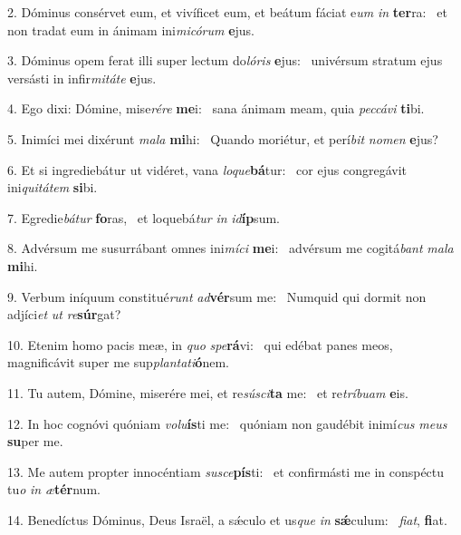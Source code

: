 2. Dóminus consérvet eum, et vivíficet eum, et beátum fáciat e\textit{um} \textit{in} \textbf{ter}ra: \ast\  et non tradat eum in ánimam ini\textit{mi}\textit{có}\textit{rum} \textbf{e}jus.\

3. Dóminus opem ferat illi super lectum do\textit{ló}\textit{ris} \textbf{e}jus: \ast\  univérsum stratum ejus versásti in infir\textit{mi}\textit{tá}\textit{te} \textbf{e}jus.\

4. Ego dixi: Dómine, mise\textit{ré}\textit{re} \textbf{me}i: \ast\  sana ánimam meam, quia \textit{pec}\textit{cá}\textit{vi} \textbf{ti}bi.\

5. Inimíci mei dixérunt \textit{ma}\textit{la} \textbf{mi}hi: \ast\  Quando moriétur, et perí\textit{bit} \textit{no}\textit{men} \textbf{e}jus?\

6. Et si ingrediebátur ut vidéret, vana \textit{lo}\textit{que}\textbf{bá}tur: \ast\  cor ejus congregávit ini\textit{qui}\textit{tá}\textit{tem} \textbf{si}bi.\

7. Egredie\textit{bá}\textit{tur} \textbf{fo}ras, \ast\  et loquebá\textit{tur} \textit{in} \textit{id}\textbf{íp}sum.\

8. Advérsum me susurrábant omnes ini\textit{mí}\textit{ci} \textbf{me}i: \ast\  advérsum me cogitá\textit{bant} \textit{ma}\textit{la} \textbf{mi}hi.\

9. Verbum iníquum constitué\textit{runt} \textit{ad}\textbf{vér}sum me: \ast\  Numquid qui dormit non adjíci\textit{et} \textit{ut} \textit{re}\textbf{súr}gat?\

10. Etenim homo pacis meæ, in \textit{quo} \textit{spe}\textbf{rá}vi: \ast\  qui edébat panes meos, magnificávit super me sup\textit{plan}\textit{ta}\textit{ti}\textbf{ó}nem.\

11. Tu autem, Dómine, miserére mei, et re\textit{sú}\textit{sci}\textbf{ta} me: \ast\  et re\textit{trí}\textit{bu}\textit{am} \textbf{e}is.\

12. In hoc cognóvi quóniam \textit{vo}\textit{lu}\textbf{ís}ti me: \ast\  quóniam non gaudébit inimí\textit{cus} \textit{me}\textit{us} \textbf{su}per me.\

13. Me autem propter innocéntiam \textit{su}\textit{sce}\textbf{pís}ti: \ast\  et confirmásti me in conspéctu tu\textit{o} \textit{in} \textit{æ}\textbf{tér}num.\

14. Benedíctus Dóminus, Deus Israël, a sǽculo et us\textit{que} \textit{in} \textbf{sǽ}culum: \ast\  \textit{fi}\textit{at}, \textbf{fi}at.\

